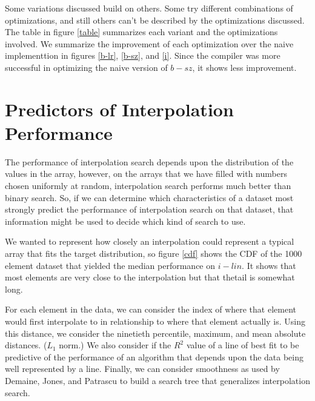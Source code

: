 \documentclass[twocolumn]{article}
\begin{document}
Some variations discussed build on others. Some try different combinations of optimizations, and still others can't be described by the optimizations discussed. The table in figure \ref{table} summarizes each variant and the optimizations involved. We summarize the improvement of each optimization over the naive implementtion in figures \ref{b-lr}, \ref{b-sz}, and \ref{i}. Since the compiler was more successful in optimizing the naive version of $b-sz$, it shows less improvement.

\section{Predictors of Interpolation Performance}
\begin{figure}[t]
\end{figure} \label{cdf}

The performance of interpolation search depends upon the distribution of the values in the array, however, on the arrays that we have filled with numbers chosen uniformly at random, interpolation search performs much better than binary search. So, if we can determine which characteristics of a dataset most strongly predict the performance of interpolation search on that dataset, that information might be used to decide which kind of search to use.

We wanted to represent how closely an interpolation could represent a typical array that fits the target distribution, so figure \ref{cdf} shows the CDF of the 1000 element dataset that yielded the median performance on $i-lin$. It shows that most elements are very close to the interpolation but that thetail is somewhat long.

For each element in the data, we can consider the index of where that element would first interpolate to in relationship to where that element actually is. Using this distance, we consider the ninetieth percentile, maximum, and mean absolute distances. ($L_1$ norm.) We also consider if the $R^2$ value of a line of best fit to be predictive of the performance of an algorithm that depends upon the data being well represented by a line. Finally, we can consider smoothness as used by Demaine, Jones, and Patrascu to build a search tree that generalizes interpolation search. \cite{demaine-jones-patrascu}
\end{document}
